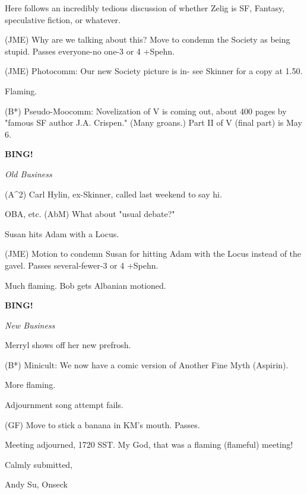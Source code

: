 \documentclass[12pt]{article}
\newcommand{\bing}{{\bf BING!} }
\newcommand{\goto}[1]{\bing \vskip 12pt \centerline{{\em{#1}}}}
\begin{document}
Here follows an incredibly tedious discussion of whether Zelig is SF, Fantasy, speculative fiction, or whatever.

(JME) Why are we talking about this? Move to condemn the Society as being stupid. Passes everyone-no one-3 or 4 +Spehn.

(JME) Photocomm: Our new Society picture is in- see Skinner for a copy at 1.50.

Flaming.

(B*) Pseudo-Moocomm: Novelization of V is coming out, about 400 pages by "famous SF author J.A. Crispen." (Many groans.) Part II of V (final part) is May 6.

\goto{Old Business}

(A^2) Carl Hylin, ex-Skinner, called last weekend to say hi.

OBA, etc. (AbM) What about "usual debate?"

Susan hits Adam with a Locus.

(JME) Motion to condemn Susan for hitting Adam with the Locus instead of the gavel. Passes several-fewer-3 or 4 +Spehn.

Much flaming. Bob gets Albanian motioned.

\goto{New Business}

Merryl shows off her new prefrosh.

(B*) Minicult: We now have a comic version of Another Fine Myth (Aspirin).

More flaming.

Adjournment song attempt fails.

(GF) Move to stick a banana in KM's mouth. Passes.

\vspace{12pt}

\noindent
Meeting adjourned, 1720 SST. My God, that was a flaming (flameful) meeting!

\vspace{18pt}

\centerline{Calmly submitted,}
\centerline{Andy Su, Onseck}
\end{document}
